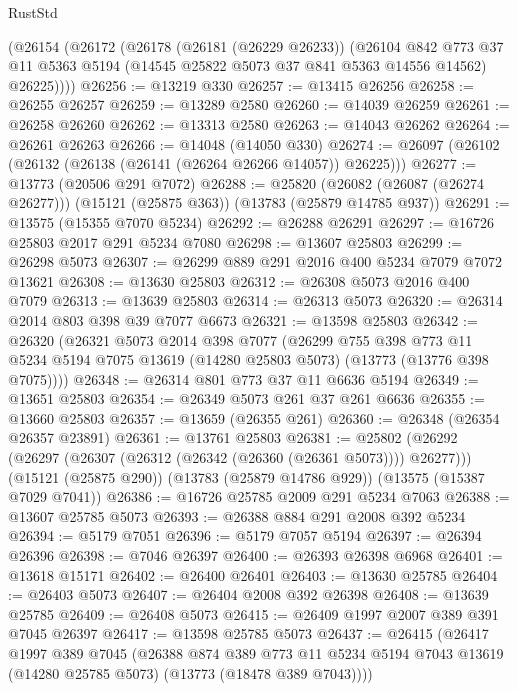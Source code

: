 \begin{lexlean}{RustStd}
\begin{coremodule}
    (@26154
      (@26172
        (@26178
          (@26181 (@26229 @26233))
          (@26104
            @842
            @773
            @37
            @11
            @5363
            @5194
            (@14545 @25822 @5073 @37 @841 @5363 @14556 @14562)
            @26225))))
@26256 := @13219 @330
@26257 := @13415 @26256
@26258 := @26255 @26257
@26259 := @13289 @2580
@26260 := @14039 @26259
@26261 := @26258 @26260
@26262 := @13313 @2580
@26263 := @14043 @26262
@26264 := @26261 @26263
@26266 := @14048 (@14050 @330)
@26274 := @26097 (@26102 (@26132 (@26138 (@26141 (@26264 @26266 @14057)) @26225)))
@26277 := @13773 (@20506 @291 @7072)
@26288 := @25820
    (@26082 (@26087 (@26274 @26277)))
    (@15121 (@25875 @363))
    (@13783 (@25879 @14785 @937))
@26291 := @13575 (@15355 @7070 @5234)
@26292 := @26288 @26291
@26297 := @16726 @25803 @2017 @291 @5234 @7080
@26298 := @13607 @25803
@26299 := @26298 @5073
@26307 := @26299 @889 @291 @2016 @400 @5234 @7079 @7072 @13621
@26308 := @13630 @25803
@26312 := @26308 @5073 @2016 @400 @7079
@26313 := @13639 @25803
@26314 := @26313 @5073
@26320 := @26314 @2014 @803 @398 @39 @7077 @6673
@26321 := @13598 @25803
@26342 := @26320
    (@26321
      @5073
      @2014
      @398
      @7077
      (@26299
        @755
        @398
        @773
        @11
        @5234
        @5194
        @7075
        @13619
        (@14280 @25803 @5073)
        (@13773 (@13776 @398 @7075))))
@26348 := @26314 @801 @773 @37 @11 @6636 @5194
@26349 := @13651 @25803
@26354 := @26349 @5073 @261 @37 @261 @6636
@26355 := @13660 @25803
@26357 := @13659 (@26355 @261)
@26360 := @26348 (@26354 @26357 @23891)
@26361 := @13761 @25803
@26381 := @25802
    (@26292 (@26297 (@26307 (@26312 (@26342 (@26360 (@26361 @5073)))) @26277)))
    (@15121 (@25875 @290))
    (@13783 (@25879 @14786 @929))
    (@13575 (@15387 @7029 @7041))
@26386 := @16726 @25785 @2009 @291 @5234 @7063
@26388 := @13607 @25785 @5073
@26393 := @26388 @884 @291 @2008 @392 @5234
@26394 := @5179 @7051
@26396 := @5179 @7057 @5194
@26397 := @26394 @26396
@26398 := @7046 @26397
@26400 := @26393 @26398 @6968
@26401 := @13618 @15171
@26402 := @26400 @26401
@26403 := @13630 @25785
@26404 := @26403 @5073
@26407 := @26404 @2008 @392 @26398
@26408 := @13639 @25785
@26409 := @26408 @5073
@26415 := @26409 @1997 @2007 @389 @391 @7045 @26397
@26417 := @13598 @25785 @5073
@26437 := @26415
    (@26417
      @1997
      @389
      @7045
      (@26388
        @874
        @389
        @773
        @11
        @5234
        @5194
        @7043
        @13619
        (@14280 @25785 @5073)
        (@13773 (@18478 @389 @7043))))

\end{coremodule}
\end{lexlean}
